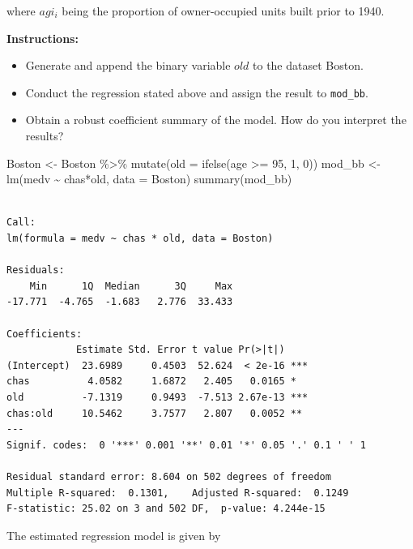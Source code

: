 \documentclass[
  12pt,
  letterpaper,
]{scrbook}
\newenvironment{Shaded}{\begin{snugshade}}{\end{snugshade}}
\newcommand{\AttributeTok}[1]{\textcolor[rgb]{0.40,0.45,0.13}{#1}}
\newcommand{\DecValTok}[1]{\textcolor[rgb]{0.68,0.00,0.00}{#1}}
\newcommand{\FunctionTok}[1]{\textcolor[rgb]{0.28,0.35,0.67}{#1}}
\newcommand{\NormalTok}[1]{\textcolor[rgb]{0.00,0.23,0.31}{#1}}
\newcommand{\OtherTok}[1]{\textcolor[rgb]{0.00,0.23,0.31}{#1}}
\newcommand{\SpecialCharTok}[1]{\textcolor[rgb]{0.37,0.37,0.37}{#1}}
\providecommand{\tightlist}{%
  \setlength{\itemsep}{0pt}\setlength{\parskip}{0pt}}
\renewcommand{\tightlist}{\setlength{\itemsep}{0.5\baselineskip}\setlength{\parskip}{0.2\baselineskip}}
\theoremstyle{plain}
\theoremstyle{definition}
\theoremstyle{remark}
\begin{document}
where \(agi_i\) being the proportion of owner-occupied units built prior
to 1940.

\textbf{Instructions:}

\begin{itemize}
\tightlist
\item
  Generate and append the binary variable \(old\) to the dataset Boston.
\item
  Conduct the regression stated above and assign the result to
  \texttt{mod\_bb}.
\item
  Obtain a robust coefficient summary of the model. How do you interpret
  the results?
\end{itemize}

\begin{Shaded}
\begin{Highlighting}[]
\NormalTok{Boston }\OtherTok{\textless{}{-}}\NormalTok{ Boston }\SpecialCharTok{\%\textgreater{}\%}
    \FunctionTok{mutate}\NormalTok{(}\AttributeTok{old =} \FunctionTok{ifelse}\NormalTok{(age }\SpecialCharTok{\textgreater{}=} \DecValTok{95}\NormalTok{, }\DecValTok{1}\NormalTok{, }\DecValTok{0}\NormalTok{))}
\NormalTok{mod\_bb }\OtherTok{\textless{}{-}} \FunctionTok{lm}\NormalTok{(medv }\SpecialCharTok{\textasciitilde{}}\NormalTok{ chas}\SpecialCharTok{*}\NormalTok{old, }\AttributeTok{data =}\NormalTok{ Boston)}
\FunctionTok{summary}\NormalTok{(mod\_bb)}
\end{Highlighting}
\end{Shaded}

\begin{verbatim}

Call:
lm(formula = medv ~ chas * old, data = Boston)

Residuals:
    Min      1Q  Median      3Q     Max 
-17.771  -4.765  -1.683   2.776  33.433 

Coefficients:
            Estimate Std. Error t value Pr(>|t|)    
(Intercept)  23.6989     0.4503  52.624  < 2e-16 ***
chas          4.0582     1.6872   2.405   0.0165 *  
old          -7.1319     0.9493  -7.513 2.67e-13 ***
chas:old     10.5462     3.7577   2.807   0.0052 ** 
---
Signif. codes:  0 '***' 0.001 '**' 0.01 '*' 0.05 '.' 0.1 ' ' 1

Residual standard error: 8.604 on 502 degrees of freedom
Multiple R-squared:  0.1301,    Adjusted R-squared:  0.1249 
F-statistic: 25.02 on 3 and 502 DF,  p-value: 4.244e-15
\end{verbatim}

The estimated regression model is given by
\end{document}
